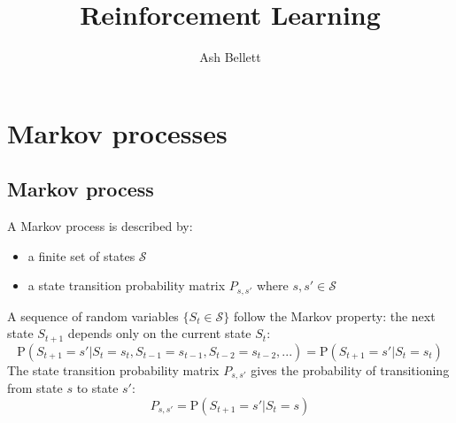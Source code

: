 \documentclass{article}
\title{\textbf{Reinforcement Learning}}
\author{Ash Bellett}
\date{}
\begin{document}
\clearpage
\maketitle
\thispagestyle{empty}
\setcounter{page}{0}
\newpage
\tableofcontents
\setcounter{page}{0}
\newpage

\section{Markov processes}

\subsection{Markov process}
A Markov process is described by:
\begin{itemize}
    \item a finite set of states $ \mathcal{S} $
    \item a state transition probability matrix $ P_{s,s'} $ where $ s, s' \in \mathcal{S} $
\end{itemize}
    A sequence of random variables $ \{S_t \in \mathcal{S} \} $ follow the Markov property: the next state $ S_{t+1} $ depends only on the current state $ S_t $:
\[ \text{P}(S_{t+1} = s' | S_t = s_t, S_{t-1} = s_{t-1}, S_{t-2} = s_{t-2}, ...) = \text{P}(S_{t+1} = s' | S_t = s_t) \]
The state transition probability matrix $ P_{s,s'} $ gives the probability of transitioning from state $ s $ to state $ s' $:
\[ P_{s,s'} = \text{P}(S_{t+1} = s' | S_t = s) \]
\end{document}
